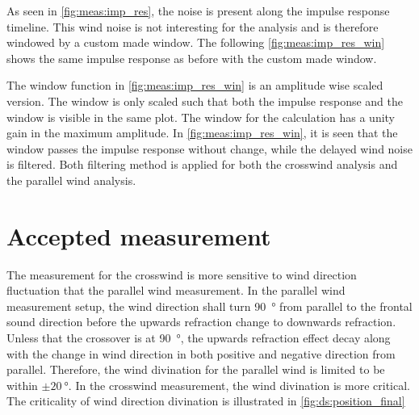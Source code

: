 

As seen in \autoref{fig:meas:imp_res}, the noise is present along the impulse response timeline. This wind noise is not interesting for the analysis and is therefore windowed by a custom made window. The following \autoref{fig:meas:imp_res_win} shows the same impulse response as before with the custom made window.



The window function in \autoref{fig:meas:imp_res_win} is an amplitude wise scaled version. The window is only scaled such that both the impulse response and the window is visible in the same plot. The window for the calculation has a unity gain in the maximum amplitude. In \autoref{fig:meas:imp_res_win}, it is seen that the window passes the impulse response without change, while the delayed wind noise is filtered. Both filtering method is applied for both the crosswind analysis and the parallel wind analysis. 


\section{Accepted measurement}
The measurement for the crosswind is more sensitive to wind direction fluctuation that the parallel wind measurement. In the parallel wind measurement setup, the wind direction shall turn \SI{90}{\degree} from parallel to the frontal sound direction before the upwards refraction change to downwards refraction. Unless that the crossover is at \SI{90}{\degree}, the upwards refraction effect decay along with the change in wind direction in both positive and negative direction from parallel. Therefore, the wind divination for the parallel wind is limited to be within $\pm\SI{20}{\degree}$. In the crosswind measurement, the wind divination is more critical. The criticality of wind direction divination is illustrated in \autoref{fig:ds:position_final}


